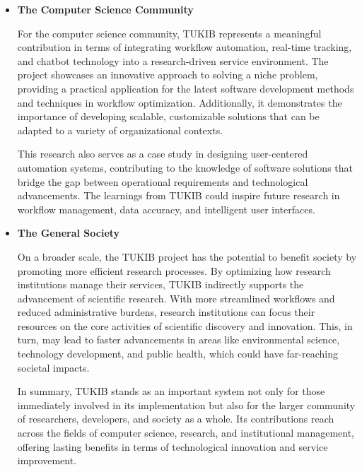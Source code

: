 \begin{itemize}
\item \textbf{The Computer Science Community}

\subitem For the computer science community, TUKIB represents a meaningful contribution in terms of integrating workflow automation, real-time tracking, and chatbot technology into a research-driven service environment. The project showcases an innovative approach to solving a niche problem, providing a practical application for the latest software development methods and techniques in workflow optimization. Additionally, it demonstrates the importance of developing scalable, customizable solutions that can be adapted to a variety of organizational contexts.

\subitem This research also serves as a case study in designing user-centered automation systems, contributing to the knowledge of software solutions that bridge the gap between operational requirements and technological advancements. The learnings from TUKIB could inspire future research in workflow management, data accuracy, and intelligent user interfaces.\newline

\item \textbf{The General Society}

\subitem On a broader scale, the TUKIB project has the potential to benefit society by promoting more efficient research processes. By optimizing how research institutions manage their services, TUKIB indirectly supports the advancement of scientific research. With more streamlined workflows and reduced administrative burdens, research institutions can focus their resources on the core activities of scientific discovery and innovation. This, in turn, may lead to faster advancements in areas like environmental science, technology development, and public health, which could have far-reaching societal impacts.

\subitem In summary, TUKIB stands as an important system not only for those immediately involved in its implementation but also for the larger community of researchers, developers, and society as a whole. Its contributions reach across the fields of computer science, research, and institutional management, offering lasting benefits in terms of technological innovation and service improvement.

\end {itemize}

